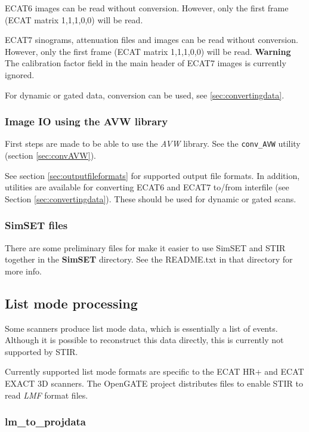 \documentclass{article}
\begin{document}
ECAT6 images can be read without conversion. However, only the 
first frame (ECAT matrix 1,1,1,0,0) will be read.

ECAT7 sinograms, attenuation files and images can be read without 
conversion. However, only the first frame (ECAT matrix 1,1,1,0,0) 
will be read.
\textbf{Warning} The calibration factor field in the main header of ECAT7 images
is currently ignored.

For dynamic or gated data, conversion can be used, see \ref{sec:convertingdata}.

\subsubsection{Image IO using the AVW library}
First steps are made to be able to use the \textit{AVW} library. See the
\texttt{conv\_AVW} utility (section \ref{sec:convAVW}).



See section \ref{sec:outputfileformats} for supported output file formats. In addition, 
utilities are available for converting ECAT6 and ECAT7 to/from 
interfile (see Section \ref{sec:convertingdata}). 
These should be used for dynamic 
or gated scans.

\subsubsection{SimSET files}
There are some preliminary files for make it easier to use SimSET and STIR together in the
\textbf{SimSET} directory. See the README.txt in that directory for more info.

\subsection{
List mode processing}

Some scanners produce list mode data, which is essentially a 
list of events. Although it is possible to reconstruct this data 
directly, this is currently not supported by STIR. 

Currently supported list mode formats are specific to the ECAT 
HR+ and ECAT EXACT 3D scanners. The OpenGATE project distributes files
to enable STIR to read \textit{LMF} format files.

\subsubsection{
lm\_to\_projdata}
\end{document}
